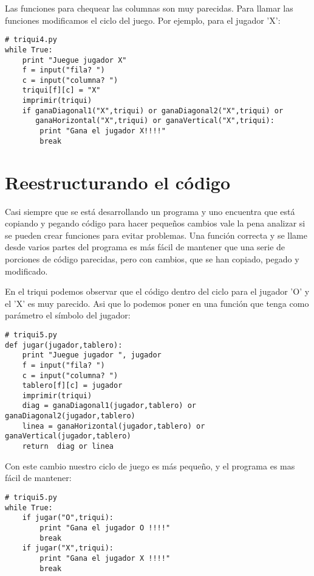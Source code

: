 Las funciones para chequear las columnas son muy parecidas. Para llamar las funciones 
modificamos el ciclo del juego. Por ejemplo, para el jugador 'X':

\beforeverb
\begin{verbatim}
# triqui4.py
while True:
    print "Juegue jugador X"
    f = input("fila? ")
    c = input("columna? ")
    triqui[f][c] = "X"
    imprimir(triqui)
    if ganaDiagonal1("X",triqui) or ganaDiagonal2("X",triqui) or 
       ganaHorizontal("X",triqui) or ganaVertical("X",triqui):
        print "Gana el jugador X!!!!"
        break
\end{verbatim}
\afterverb

\section{Reestructurando el código}

Casi siempre que se está desarrollando un programa y uno encuentra que está copiando y
pegando código para hacer pequeños cambios vale la pena analizar si se pueden crear
funciones para evitar problemas. Una función correcta y se llame desde
varios partes del programa es más fácil de mantener que una serie de porciones de 
código parecidas, pero con cambios, que se han copiado, pegado y modificado.

En el triqui podemos observar que el código dentro del ciclo para el jugador 'O' 
y el 'X' es muy parecido. Asi que  lo podemos poner en una
función que tenga como parámetro el símbolo del jugador:

\beforeverb
\begin{verbatim}
# triqui5.py
def jugar(jugador,tablero):
    print "Juegue jugador ", jugador
    f = input("fila? ")
    c = input("columna? ")
    tablero[f][c] = jugador
    imprimir(triqui)
    diag = ganaDiagonal1(jugador,tablero) or ganaDiagonal2(jugador,tablero)
    linea = ganaHorizontal(jugador,tablero) or ganaVertical(jugador,tablero)
    return  diag or linea
\end{verbatim}
\afterverb

Con este cambio nuestro ciclo de juego es más pequeño, y el programa es mas
fácil de mantener:

\beforeverb
\begin{verbatim}
# triqui5.py
while True:
    if jugar("O",triqui):
        print "Gana el jugador O !!!!"
        break
    if jugar("X",triqui):
        print "Gana el jugador X !!!!"
        break
\end{verbatim}
\afterverb

